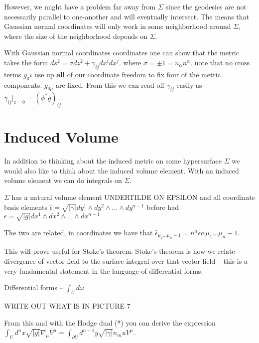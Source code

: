 \documentclass[10pt]{article}
\begin{document}
		However, we might have a problem far away from $\Sigma$ since the geodesics are not necessarily parallel to one-another and will eventually intersect. The means that Gaussian normal coordinates will only work in some neighborhood around $\Sigma$, where the size of the neighborhood depends on $\Sigma$. 
			
	With Gaussian normal coordinates  coordinates one can show that the metric takes the form $ds^2 = \sigma dz^2 + \gamma_{ij}dx^idx^j$. where $\sigma = \pm 1 = n_\alpha n^\alpha$. note that no cross terms $g_0i$ use up \textbf{all} of our coordinate freedom to fix four of the metric components. $g_{0\mu}$ are fixed. 
	From this we can read off $\gamma_{ij}$ easily as   $\gamma_{ij}|_{z=0} = (\phi^* g)_{ij}$.
	
\section{Induced Volume}
	In addition to thinking about the induced metric on some hypersurface $\Sigma$ we would also like to think about the induced volume element. With an induced volume element we can do integrals on $\Sigma$. 
	
	$\Sigma$ has a natural volume element UNDERTILDE ON EPSILON and all coordinate basis elements  $\hat{\epsilon} = \sqrt{|\gamma|} dy^1\wedge dy^2 \wedge ... \wedge dy^{n-1}$ before had  $\epsilon = \sqrt{|g|} dx^1\wedge dx^2 \wedge ... \wedge dx^{n-1}$
	
	The two are related, in coordinates we have that  $\hat{\epsilon}_{\mu_1...\mu_n-1} = n^\alpha \epsilon{\alpha \mu_1...\mu_n-1} .$
	
	This will prove useful for Stoke's theorem. Stoke's theorem is how we relate divergence of vector field to the surface integral over that vector field -- this is a very fundamental statement in the language of differential forms. 
	
	Differential forms -- $\int_U d\omega $
	
	WRITE OUT WHAT IS IN PICTURE 7
	
	From this and with the Hodge dual (*) you can derive the expression $\int_U d^n x \sqrt{|g|} \nabla_\mu V^\mu = \int_{\partial U} d^{n-1} y \sqrt{|\gamma|} n_mu V^\mu$. 
\end{document}

